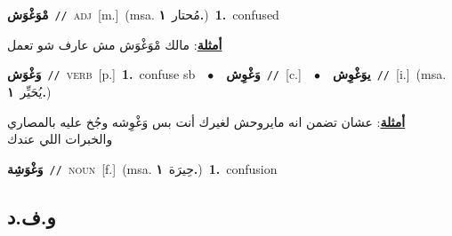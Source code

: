 \documentclass[10pt,a4paper,twoside]{article} %
\begin{document}
\begin{multicols}{2}
{\setlength\topsep{0pt}\textbf{\foreignlanguage{arabic}{مْوَغْوَش}}\ {\color{gray}\texttt{//}\color{black}}\ \textsc{adj}\ [m.]\ \color{gray}(msa. \foreignlanguage{arabic}{مُحتار}~\foreignlanguage{arabic}{\textbf{١.}})\color{black}\ \textbf{1.}~confused\  \begin{flushright}\color{gray}\foreignlanguage{arabic}{\textbf{\underline{\foreignlanguage{arabic}{أمثلة}}}: مالك مْوَغْوَش مش عارف شو تعمل}\end{flushright}\color{black}} \vspace{2mm}

{\setlength\topsep{0pt}\textbf{\foreignlanguage{arabic}{وَغْوَش}}\ {\color{gray}\texttt{//}\color{black}}\ \textsc{verb}\ [p.]\ \textbf{1.}~confuse sb\ \ $\bullet$\ \ \setlength\topsep{0pt}\textbf{\foreignlanguage{arabic}{وَغْوِش}}\ {\color{gray}\texttt{//}\color{black}}\ [c.]\ \ $\bullet$\ \ \setlength\topsep{0pt}\textbf{\foreignlanguage{arabic}{يوَغْوِش}}\ {\color{gray}\texttt{//}\color{black}}\ [i.]\ \color{gray}(msa. \foreignlanguage{arabic}{يُحَيِّر}~\foreignlanguage{arabic}{\textbf{١.}})\color{black}\  \begin{flushright}\color{gray}\foreignlanguage{arabic}{\textbf{\underline{\foreignlanguage{arabic}{أمثلة}}}: عشان تضمن انه مايروحش لغيرك أنت بس وَغْوِشه وجُخ عليه بالمصاري والخبرات اللي عندك}\end{flushright}\color{black}} \vspace{2mm}

{\setlength\topsep{0pt}\textbf{\foreignlanguage{arabic}{وَغْوَشِة}}\ {\color{gray}\texttt{//}\color{black}}\ \textsc{noun}\ [f.]\ \color{gray}(msa. \foreignlanguage{arabic}{حِيرَة}~\foreignlanguage{arabic}{\textbf{١.}})\color{black}\ \textbf{1.}~confusion\ } \vspace{2mm}

\vspace{-3mm}
\subsection*{\color{blue}\foreignlanguage{arabic}{و.ف.د}\color{blue}{}} 


\end{multicols}
\end{document}
